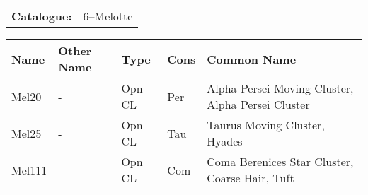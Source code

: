 \begin{tabular}{ p{0.9in} p{1.3in}}
{\bf Catalogue:} & 6--Melotte \\ 
\end{tabular}
\centering 
\begin{longtable}{ p{0.7in}  p{1.0in}  p{0.6in}  p{0.9in}  p{4.0in} }
\hline 
{\bf Name} & {\bf Other Name} & {\bf Type} & {\bf Cons} & {\bf Common Name} \\ 
\hline 
Mel20 & - & Opn CL & Per & Alpha Persei Moving Cluster, Alpha Persei Cluster \\ 
Mel25 & - & Opn CL & Tau & Taurus Moving Cluster, Hyades \\ 
Mel111 & - & Opn CL & Com & Coma Berenices Star Cluster, Coarse Hair, Tuft \\ 
\hline 
\end{longtable} 

